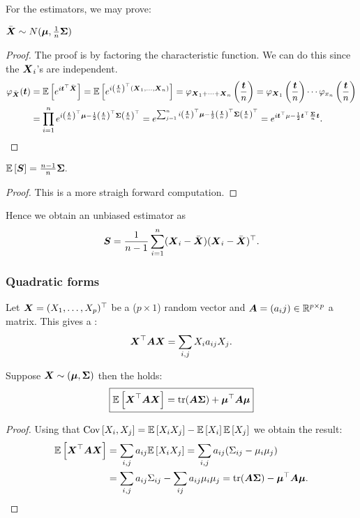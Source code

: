 For the estimators, we may prove:
\begin{proposition}
    $\bar{\boldsymbol{X}} \sim N(\boldsymbol{\mu}, \frac{1}{n}\boldsymbol{\Sigma})$
\end{proposition}
\begin{proof}
    The proof is by factoring the characteristic function. We can do this since the $\boldsymbol{X}_i$'s are independent.
    \begin{align*}
        \varphi_{\bar{\boldsymbol{X}}}(\boldsymbol{t}) 
        &= \mathbb{E}\left[e^{i \boldsymbol{t}^\top \bar{\boldsymbol{X}}}\right]
        = \mathbb{E}\left[ e^{i \left(\frac{\boldsymbol{t}}{n}\right)^\top (\boldsymbol{X}_1, \ldots, \boldsymbol{X}_n)} \right]
        = \varphi_{\boldsymbol{X}_1+\dots+\boldsymbol{X}_n} \left(\frac{\boldsymbol{t}}{n}\right)
        = \varphi_{\boldsymbol{X}_1} \left( \frac{\boldsymbol{t}}{n} \right) \cdots \varphi_{x_n} \left( \frac{\boldsymbol{t}}{n} \right)
        \\&= \prod_{i=1}^{n} e^{ i \left(\frac{\boldsymbol{t}}{n}\right)^\top\boldsymbol{\mu} - \frac{1}{2} \left(\frac{\boldsymbol{t}}{n}\right)^\top \boldsymbol{\Sigma} \left(\frac{\boldsymbol{t}}{n}\right)^\top }
        = e^{\sum_{j=1}^{n} i \left(\frac{\boldsymbol{t}}{n}\right)^\top\boldsymbol{\mu} - \frac{1}{2} \left(\frac{\boldsymbol{t}}{n}\right)^\top \boldsymbol{\Sigma} \left(\frac{\boldsymbol{t}}{n}\right)^\top}
        = e^{ i \boldsymbol{t}^\top \mu - \frac{1}{2} \boldsymbol{t}^\top \frac{\boldsymbol{\Sigma}}{n} \boldsymbol{t} }.
    \end{align*}

\end{proof}
\begin{proposition}
    $\mathbb{E}\left[\boldsymbol{S}\right] = \frac{n-1}{n} \boldsymbol{\Sigma}.$
\end{proposition}
\begin{proof}
    This is a more straigh forward computation.
\end{proof}
Hence we obtain an unbiased estimator as
$$
    \boldsymbol{S} = \frac{1}{n-1} \sum_{i=1}^n (\boldsymbol{X}_i-\bar{\boldsymbol{X}})(\boldsymbol{X}_i-\bar{\boldsymbol{X}})^\top.
$$

\subsubsection{Quadratic forms}
Let $\boldsymbol{X}=(X_1,\dots,X_p)^\top$ be a ($p\times 1$) random vector and $\boldsymbol{A}=(a_ij)\in\mathbb{R}^{p\times p}$ a matrix. This gives a :
$$
    \boldsymbol{X}^\top\boldsymbol{A}\boldsymbol{X} = \sum_{i,j} X_ia_{ij}X_j.
$$ 
\begin{theorem} Suppose $\boldsymbol{X}\sim (\boldsymbol{\mu}, \boldsymbol{\Sigma})$ then the  holds:
    \begin{equation}
        \boxed{\mathbb{E}\left[\boldsymbol{X}^\top\boldsymbol{A}\boldsymbol{X}\right] = \mathrm{tr}(\boldsymbol{A\Sigma}) + \boldsymbol{\mu}^\top\boldsymbol{A}\boldsymbol{\mu}
       } 
    \end{equation}
\end{theorem} 
\begin{proof}
    Using that $\mathrm{Cov}\left[X_i,X_j\right] = \mathbb{E}\left[X_iX_j\right]-\mathbb{E}\left[X_i\right]\mathbb{E}\left[X_j\right]$ we obtain the result:
    \begin{align*}
        \mathbb{E}\left[\boldsymbol{X}^\top\boldsymbol{A}\boldsymbol{X}\right]
        &= \sum_{i,j}a_{ij}\mathbb{E}\left[X_iX_j\right]
        = \sum_{i,j}a_{ij}(\Sigma_{ij}-\mu_i\mu_j)
        \\&= \sum_{i,j}a_{ij}\Sigma_{ij} -  \sum_{ij}a_{ij}\mu_i\mu_j
        = \mathrm{tr}(\boldsymbol{A}\boldsymbol{\Sigma}) - \boldsymbol{\mu}^\top\boldsymbol{A}\boldsymbol{\mu}.
    \end{align*}
\end{proof}

